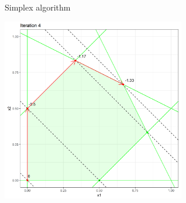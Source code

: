 \documentclass[11pt,compress,t,notes=noshow, xcolor=table]{beamer}
\begin{document}
\begin{vbframe}{Simplex algorithm}
\framebreak

\begin{center}
\includegraphics[width = 0.6\textwidth]{figure_man/simplex_implementation/iter4.png}
\end{center}

\end{vbframe}

%

\endlecture
\end{document}
